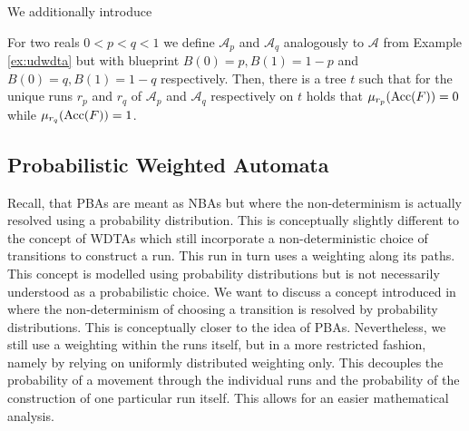 We additionally introduce
\begin{proposition}
  \cite[Proposition 11]{RandAutoInfTrees}
  For two reals $0 < p < q < 1$ we define $\mathcal{A}_{p}$ and
  $\mathcal{A}_{q}$ analogously to $\mathcal{A}$ from Example \ref{ex:udwdta}
  but with blueprint $B(0) = p, B(1) = 1-p$ and $B(0) = q, B(1) = 1-q$
  respectively. Then, there is a tree $t$ such that for the unique runs $r_{p}$
  and $r_{q}$ of $\mathcal{A}_{p}$ and $\mathcal{A}_{q}$ respectively on
  $t$ holds that $\mu_{r_{p}}(\operatorname{Acc}(F)) = 0$ while $\mu_{r_{q}}(\operatorname{Acc}(F)) = 1$.
\end{proposition}

\subsection{Probabilistic Weighted Automata}
Recall, that \acp{PBA} are meant as \acp{NBA} but where the non-determinism is
actually resolved using a probability distribution. This is conceptually 
slightly different to the concept of \acp{WDTA} which still incorporate a 
non-deterministic choice of transitions to construct a run. This run in turn 
uses a weighting along its paths. This concept is modelled using probability 
distributions but is not necessarily understood as a probabilistic choice. We 
want to discuss a concept introduced in \cite[Chapter 4]{RandAutoInfTrees} 
where the non-determinism of choosing a transition is resolved by probability 
distributions. This is conceptually closer to the idea of \acp{PBA}. 
Nevertheless, we still use a weighting within the runs itself, but in a more 
restricted fashion, namely by relying on uniformly distributed weighting only. 
This decouples the probability of a movement through the individual runs and 
the probability of the construction of one particular run itself. This allows 
for an easier mathematical analysis.

